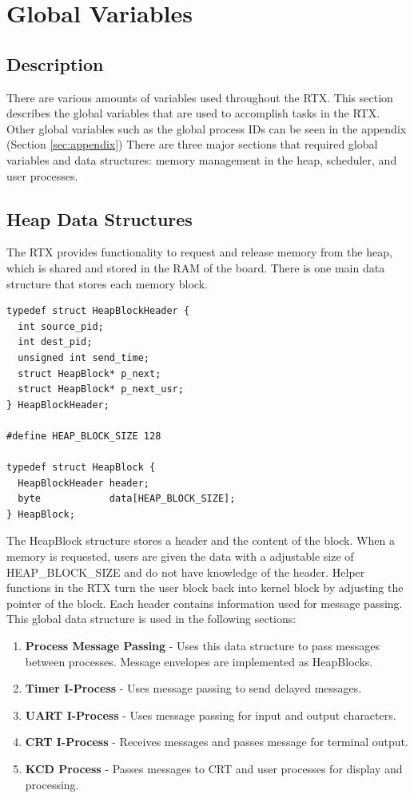 \documentclass[12pt]{report}
\begin{document}
\chapter{Global Variables}
\section{Description}
There are various amounts of variables used throughout the RTX. This section describes the global variables that are used to accomplish tasks in the RTX. Other global variables such as the global process IDs can be seen in the appendix (Section \ref{sec:appendix}) There are three major sections that required global variables and data structures: memory management in the heap, scheduler, and user processes.

\section{Heap Data Structures}
The RTX provides functionality to request and release memory from the heap, which is shared and stored in the RAM of the board. There is one main data structure that stores each memory block.

\begin{lstlisting}
typedef struct HeapBlockHeader {
  int source_pid;
  int dest_pid;
  unsigned int send_time;
  struct HeapBlock* p_next;
  struct HeapBlock* p_next_usr;
} HeapBlockHeader;

#define HEAP_BLOCK_SIZE 128

typedef struct HeapBlock {
  HeapBlockHeader header;
  byte            data[HEAP_BLOCK_SIZE];
} HeapBlock;

\end{lstlisting}

The HeapBlock structure stores a header and the content of the block. When a memory is requested, users are given the data with a adjustable size of HEAP\_BLOCK\_SIZE and do not have knowledge of the header. Helper functions in the RTX turn the user block back into kernel block by adjusting the pointer of the block. Each header contains information used for message passing. This global data structure is used in the following sections:
\begin{enumerate}
    \item {\bf Process Message Passing} - Uses this data structure to pass messages between processes. Message envelopes are implemented as HeapBlocks.
    \item {\bf Timer I-Process} - Uses message passing to send delayed messages.
    \item {\bf UART I-Process} - Uses message passing for input and output characters.
    \item {\bf CRT I-Process} - Receives messages and passes message for terminal output.
    \item {\bf KCD Process} - Passes messages to CRT and user processes for display and processing.
\end{enumerate}
\end{document}
